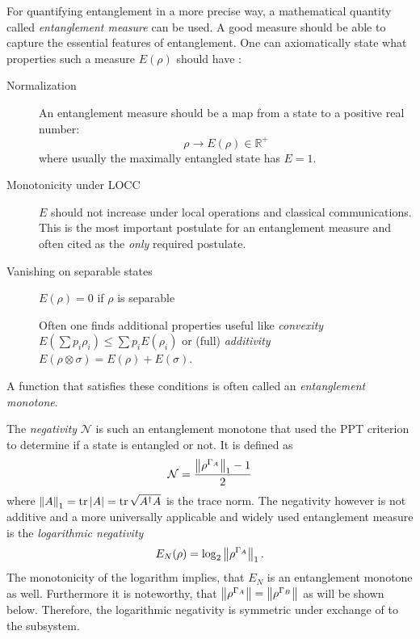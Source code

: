 For quantifying entanglement in a more precise way, a mathematical quantity called \emph{entanglement measure} can be used. A good measure should be able to capture the essential features of entanglement. One can axiomatically state what properties such a measure $E(\rho)$ should have \cite{Plenio_2005a,Horodecki_2009}:
\begin{description}
  \item[Normalization] An entanglement measure should be a map from a state to a positive real number:
  \begin{equation}
    \rho \rightarrow E(\rho) \in \mathbb{R}^+
  \end{equation}
  where usually the maximally entangled state has $E=1$.
  \item[Monotonicity under LOCC] $E$ should not increase under local operations and classical communications. This is the most important postulate for an entanglement measure and often cited as the \textit{only} required postulate.
  \item[Vanishing on separable states] $E(\rho)=0$ if $\rho$ is separable
  \item[] Often one finds additional properties useful like \textit{convexity} $E(\sum p_i \rho_i) \leq \sum p_i E(\rho_i)$ or (full) \textit{additivity} $E(\rho \otimes \sigma) = E(\rho) + E(\sigma)$.
\end{description}
A function that satisfies these conditions is often called an \textit{entanglement monotone}.

The \emph{negativity} $\mathcal{N}$ is such an entanglement monotone \cite{Vidal_2001,Plenio_2005a} that used the PPT criterion to determine if a state is entangled or not. It is defined as 
\begin{equation}\label{eq:2:negativity}
  \mathcal{N} = \frac{\left\lVert\rho^{\Gamma_A}\right\rVert_1 - 1}{2}
\end{equation}
where $\left\lVert A\right\rVert_1 = \tr\left\lvert A\right\rvert = \tr \sqrt{A^\dagger A}$ is the trace norm. The negativity however is not additive and a more universally applicable and widely used entanglement measure is the \emph{logarithmic negativity} \cite{Plenio_2005}
\begin{equation}\label{eq:2:logarithmic-negativity}
  E_N(\rho) = \log_2\left\lVert\rho^{\Gamma_A}\right\rVert_1 .
\end{equation}
The monotonicity of the logarithm implies, that $E_N$ is an entanglement monotone as well.
Furthermore it is noteworthy, that $\left\lVert\rho^{\Gamma_A}\right\rVert = \left\lVert\rho^{\Gamma_B}\right\rVert$ as will be shown below. Therefore, the logarithmic negativity is symmetric under exchange of to the subsystem.

